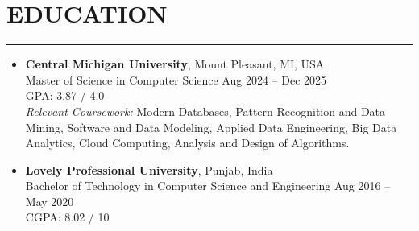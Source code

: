 \documentclass[11pt]{article}
\begin{document}
\section*{EDUCATION}
\vspace{-1.2em}
\noindent\rule{\linewidth}{0.4pt}
\begin{itemize}[leftmargin=0pt, itemsep=5pt, label=]

  \item
\textbf{Central Michigan University}, Mount Pleasant, MI, USA\\
Master of Science in Computer Science \hfill Aug 2024 -- Dec 2025 \\
GPA: 3.87 / 4.0\\
\textit{Relevant Coursework:} Modern Databases, Pattern Recognition and Data Mining, Software and Data Modeling, Applied Data Engineering, Big Data Analytics, Cloud Computing, Analysis and Design of Algorithms.


\item
\textbf{Lovely Professional University}, Punjab, India \\
Bachelor of Technology in Computer Science and Engineering \hfill Aug 2016 -- May 2020 \\
CGPA: 8.02 / 10
\end{itemize}


\end{document}
